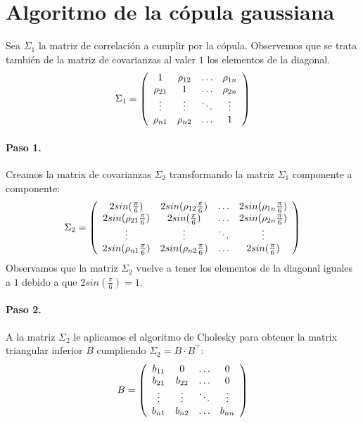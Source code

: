 
\section{Algoritmo de la c\'opula gaussiana}

 Sea $\Sigma_1$ la matriz de correlaci\'on a cumplir
por la c\'opula. Observemos que se trata tambi\'en de la matriz de covarianzas
al valer $1$ los elementos de la diagonal.
\begin{displaymath}
\Sigma_1 = \left( 
\begin{array}{cccc}
1          & \rho_{12} & \ldots & \rho_{1n} \cr
\rho_{21} & 1          & \ldots & \rho_{2n} \cr
\vdots    & \vdots    & \ddots & \vdots   \cr
\rho_{n1} & \rho_{n2} & \ldots & 1
\end{array}
\right)
\end{displaymath}

\paragraph{Paso 1.} Creamos la matrix de covarianzas $\Sigma_2$ transformando 
la matriz $\Sigma_1$ componente a componente:
\begin{displaymath}
\Sigma_2 = \left( 
\begin{array}{cccc}
2 sin(\frac{\pi}{6})           & 2 sin(\rho_{12} \frac{\pi}{6}) & \ldots & 2 sin(\rho_{1n} \frac{\pi}{6})\cr
2 sin(\rho_{21} \frac{\pi}{6}) & 2 sin(\frac{\pi}{6})           & \ldots & 2 sin(\rho_{2n} \frac{\pi}{6})\cr
\vdots                          & \vdots                          & \ddots  & \vdots   \cr
2 sin(\rho_{n1} \frac{\pi}{6}) & 2 sin(\rho_{n2} \frac{\pi}{6}) & \ldots & 2 sin(\frac{\pi}{6})
\end{array}
\right)
\end{displaymath}
Observamos que la matriz $\Sigma_2$ vuelve a tener los elementos de la
diagonal iguales a $1$ debido a que $2 sin(\frac{\pi}{6}) = 1$.

\paragraph{Paso 2.} A la matriz $\Sigma_2$ le aplicamos el algoritmo de 
Cholesky para obtener la matrix triangular
inferior $B$ cumpliendo $\Sigma_2 = B \cdot B^{\top}$:
\begin{displaymath}
B = 
\left(
\begin{array}{cccc}
b_{11}   & 0        & \ldots & 0       \cr
b_{21}   & b_{22}   & \ldots & 0       \cr
\vdots  & \vdots  & \ddots & \vdots \cr
b_{n1}   & b_{n2}   & \ldots & b_{nn}
\end{array}
\right)
\end{displaymath}

